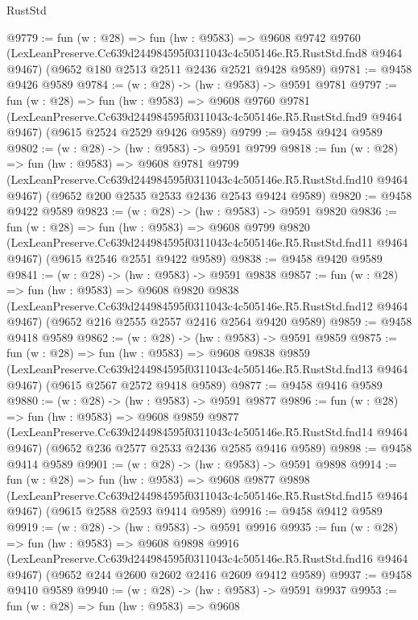 \begin{lexlean}{RustStd}
\begin{coremodule}
@9779 := fun (w : @28) =>
  fun (hw : @9583) =>
  @9608
    @9742
    @9760
    (LexLeanPreserve.Cc639d244984595f0311043c4c505146e.R5.RustStd.fnd8 @9464 @9467)
    (@9652 @180 @2513 @2511 @2436 @2521 @9428 @9589)
@9781 := @9458 @9426 @9589
@9784 := (w : @28) -> (hw : @9583) -> @9591 @9781
@9797 := fun (w : @28) =>
  fun (hw : @9583) =>
  @9608
    @9760
    @9781
    (LexLeanPreserve.Cc639d244984595f0311043c4c505146e.R5.RustStd.fnd9 @9464 @9467)
    (@9615 @2524 @2529 @9426 @9589)
@9799 := @9458 @9424 @9589
@9802 := (w : @28) -> (hw : @9583) -> @9591 @9799
@9818 := fun (w : @28) =>
  fun (hw : @9583) =>
  @9608
    @9781
    @9799
    (LexLeanPreserve.Cc639d244984595f0311043c4c505146e.R5.RustStd.fnd10 @9464 @9467)
    (@9652 @200 @2535 @2533 @2436 @2543 @9424 @9589)
@9820 := @9458 @9422 @9589
@9823 := (w : @28) -> (hw : @9583) -> @9591 @9820
@9836 := fun (w : @28) =>
  fun (hw : @9583) =>
  @9608
    @9799
    @9820
    (LexLeanPreserve.Cc639d244984595f0311043c4c505146e.R5.RustStd.fnd11 @9464 @9467)
    (@9615 @2546 @2551 @9422 @9589)
@9838 := @9458 @9420 @9589
@9841 := (w : @28) -> (hw : @9583) -> @9591 @9838
@9857 := fun (w : @28) =>
  fun (hw : @9583) =>
  @9608
    @9820
    @9838
    (LexLeanPreserve.Cc639d244984595f0311043c4c505146e.R5.RustStd.fnd12 @9464 @9467)
    (@9652 @216 @2555 @2557 @2416 @2564 @9420 @9589)
@9859 := @9458 @9418 @9589
@9862 := (w : @28) -> (hw : @9583) -> @9591 @9859
@9875 := fun (w : @28) =>
  fun (hw : @9583) =>
  @9608
    @9838
    @9859
    (LexLeanPreserve.Cc639d244984595f0311043c4c505146e.R5.RustStd.fnd13 @9464 @9467)
    (@9615 @2567 @2572 @9418 @9589)
@9877 := @9458 @9416 @9589
@9880 := (w : @28) -> (hw : @9583) -> @9591 @9877
@9896 := fun (w : @28) =>
  fun (hw : @9583) =>
  @9608
    @9859
    @9877
    (LexLeanPreserve.Cc639d244984595f0311043c4c505146e.R5.RustStd.fnd14 @9464 @9467)
    (@9652 @236 @2577 @2533 @2436 @2585 @9416 @9589)
@9898 := @9458 @9414 @9589
@9901 := (w : @28) -> (hw : @9583) -> @9591 @9898
@9914 := fun (w : @28) =>
  fun (hw : @9583) =>
  @9608
    @9877
    @9898
    (LexLeanPreserve.Cc639d244984595f0311043c4c505146e.R5.RustStd.fnd15 @9464 @9467)
    (@9615 @2588 @2593 @9414 @9589)
@9916 := @9458 @9412 @9589
@9919 := (w : @28) -> (hw : @9583) -> @9591 @9916
@9935 := fun (w : @28) =>
  fun (hw : @9583) =>
  @9608
    @9898
    @9916
    (LexLeanPreserve.Cc639d244984595f0311043c4c505146e.R5.RustStd.fnd16 @9464 @9467)
    (@9652 @244 @2600 @2602 @2416 @2609 @9412 @9589)
@9937 := @9458 @9410 @9589
@9940 := (w : @28) -> (hw : @9583) -> @9591 @9937
@9953 := fun (w : @28) =>
  fun (hw : @9583) =>
  @9608

\end{coremodule}
\end{lexlean}
